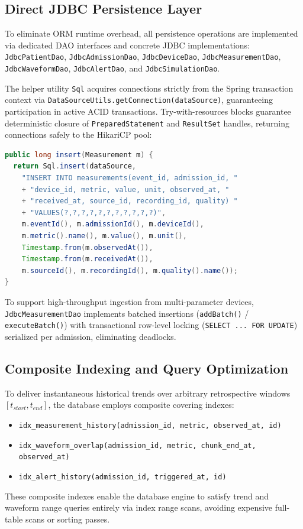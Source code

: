 \documentclass[10pt,journal,compsoc]{IEEEtran}
\begin{document}
\subsection{Direct JDBC Persistence Layer}
To eliminate ORM runtime overhead, all persistence operations are implemented via dedicated DAO interfaces and concrete JDBC implementations: \texttt{JdbcPatientDao}, \texttt{JdbcAdmissionDao}, \texttt{JdbcDeviceDao}, \texttt{JdbcMeasurementDao}, \texttt{JdbcWaveformDao}, \texttt{JdbcAlertDao}, and \texttt{JdbcSimulationDao}.

The helper utility \texttt{Sql} acquires connections strictly from the Spring transaction context via \texttt{DataSourceUtils.getConnection(dataSource)}, guaranteeing participation in active ACID transactions. Try-with-resources blocks guarantee deterministic closure of \texttt{PreparedStatement} and \texttt{ResultSet} handles, returning connections safely to the HikariCP pool:
\begin{lstlisting}[language=Java]
public long insert(Measurement m) {
  return Sql.insert(dataSource,
    "INSERT INTO measurements(event_id, admission_id, "
    + "device_id, metric, value, unit, observed_at, "
    + "received_at, source_id, recording_id, quality) "
    + "VALUES(?,?,?,?,?,?,?,?,?,?,?)",
    m.eventId(), m.admissionId(), m.deviceId(),
    m.metric().name(), m.value(), m.unit(),
    Timestamp.from(m.observedAt()),
    Timestamp.from(m.receivedAt()),
    m.sourceId(), m.recordingId(), m.quality().name());
}
\end{lstlisting}
To support high-throughput ingestion from multi-parameter devices, \texttt{JdbcMeasurementDao} implements batched insertions (\texttt{addBatch()} / \texttt{executeBatch()}) with transactional row-level locking (\texttt{SELECT ... FOR UPDATE}) serialized per admission, eliminating deadlocks.

\subsection{Composite Indexing and Query Optimization}
To deliver instantaneous historical trends over arbitrary retrospective windows $[t_{start}, t_{end}]$, the database employs composite covering indexes:
\begin{itemize}
    \item \texttt{idx\_measurement\_history(admission\_id, metric, observed\_at, id)}
    \item \texttt{idx\_waveform\_overlap(admission\_id, metric, chunk\_end\_at, observed\_at)}
    \item \texttt{idx\_alert\_history(admission\_id, triggered\_at, id)}
\end{itemize}
These composite indexes enable the database engine to satisfy trend and waveform range queries entirely via index range scans, avoiding expensive full-table scans or sorting passes.
\end{document}
